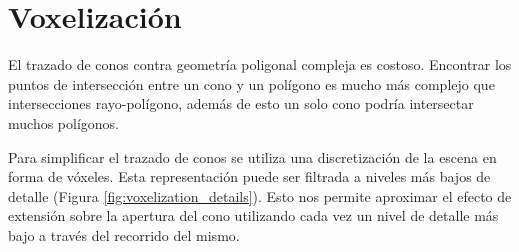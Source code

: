 \section{Voxelización} %
\label{sec:voxelizacion}
El trazado de conos contra geometría poligonal compleja es costoso. Encontrar los puntos de intersección entre un cono y un polígono es mucho más complejo que intersecciones rayo-polígono, además de esto un solo cono podría intersectar muchos polígonos.

Para simplificar el trazado de conos se utiliza una discretización de la escena en forma de vóxeles. Esta representación puede ser filtrada a niveles más bajos de detalle (Figura \ref{fig:voxelization_details}). Esto nos permite aproximar el efecto de extensión sobre la apertura del cono utilizando cada vez un nivel de detalle más bajo a través del recorrido del mismo.

